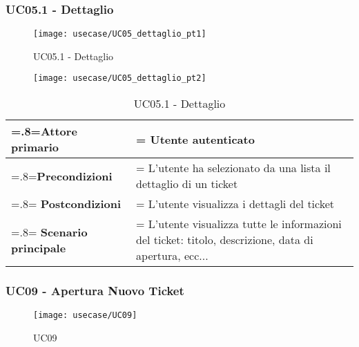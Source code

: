 \subsubsection{UC05.1 - Dettaglio}

\begin{figure}[H]
    \centering 
    \texttt{[image: usecase/UC05\_dettaglio\_pt1]}
    \caption{UC05.1 - Dettaglio}
\end{figure}
             \begin{figure}[H]
    \centering 
    \texttt{[image: usecase/UC05\_dettaglio\_pt2]}
\end{figure} 
        
\begin{table}[H]
                \centering
                \renewcommand{\arraystretch}{1.8}
                \renewcommand\tabularxcolumn[1]{m{#1}}
                \begin{tabularx}{0.9\textwidth} {
                    >{\hsize=.8\hsize\linewidth=\hsize}X
                    >{\hsize=1.2\hsize\linewidth=\hsize}X}
                    \hline
                    \textbf{Attore primario} & Utente autenticato \\
                    \hline
                    \textbf{Precondizioni} & L'utente ha selezionato da una lista il dettaglio di un ticket \\
                    \hline
                    \textbf{Postcondizioni} & L'utente visualizza i dettagli del ticket \\
                    \hline
                    \textbf{Scenario principale} & L'utente visualizza tutte le informazioni del ticket: titolo, descrizione, data di apertura, ecc... \\
                    \hline
                \end{tabularx}
                \caption{UC05.1 - Dettaglio}
            \end{table}  
           
\subsubsection{UC09 - Apertura Nuovo Ticket}

\begin{figure}[H]
    \centering 
    \texttt{[image: usecase/UC09]}
    \caption{UC09}
\end{figure}
 

